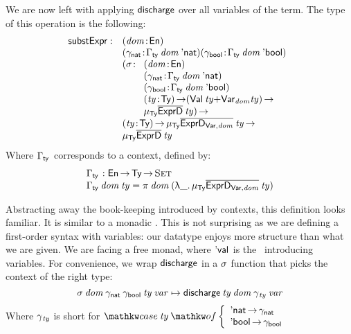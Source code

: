 We are now left with applying $\discharge$ over all variables of the
term. The type of this operation is the following:
%
\[
\begin{array}{@{}ll}
\substH  : & \PITEL{\V{dom}}{\EnumU} \\
           & \PITEL{\V{\gammaNat}}{\GammaSpi{\V{dom}}{\Enat}} 
             \PITEL{\V{\gammaBool}}{\GammaSpi{\V{dom}}{\Ebool}} \\
           & \begin{array}{@{}ll}
             \PI{\V{\sigma}}{& \PITEL{\V{dom}}{\EnumU} \\
                             & \PITEL{\V{\gammaNat}}
                                     {\GammaSpi{\V{dom}}{\Enat}} \\
                             & \PITEL{\V{\gammaBool}}
                                     {\GammaSpi{\V{dom}}{\Ebool}} \\
                             & \PI{\V{ty}}{\Ty} (\SUM{\Val{\V{ty}}}{\Var{\V{dom}}{\V{ty}}}) \To \\
                             & \IMu{\Ty}{\toIDesc{\HExprD}}{\V{ty}}}
             \end{array}\\
          & \PI{\V{ty}}{\Ty}
            \IMu{\Ty}{\toIDesc{\HExprVarD{\V{dom}}}}{\V{ty}} \To \\
          & \IMu{\Ty}{\toIDesc{\HExprD}}{\V{ty}}
\end{array}
\]
%
Where $\GammaSpi{\!}{\!}$ corresponds to a context, defined by:
%
\[\stk{
\GammaSpi{\!}{\!} : \EnumU \To \Ty \To \Set                                             \\
\GammaSpi{\V{dom}}{\V{ty}} = \spi{\V{dom}}{(\LAM{\_} \IMu{\Ty}{\toIDesc{\HExprVarD{\V{dom}}}}{\V{ty}})} 
}\]


Abstracting away the book-keeping introduced by contexts, this
definition looks familiar. It is similar to a monadic \bind. This is
not surprising as we are defining a first-order syntax with variables:
our datatype enjoys more structure than what we are given. We are
facing a free monad, where $\Eval{\!}$ is the \return\ introducing
variables. For convenience, we wrap $\discharge$ in a $\V{\sigma}$
function that picks the context of the right type:
%
\[
\F{$\sigma$}\: \V{dom}\: \gammaNat\: \gammaBool\: \V{ty}\: \V{var} \mapsto
    \F{$\discharge$}\: \V{ty}\: \V{dom}\: \F{$\gamma$}_{\V{ty}}\: \V{var} 
\]
%
Where $\F{$\gamma$}_{\V{ty}}$ is short for
 $\caseB{\V{ty}}{\Enat  \To \gammaNat \\
                 \Ebool \To \gammaBool}$

